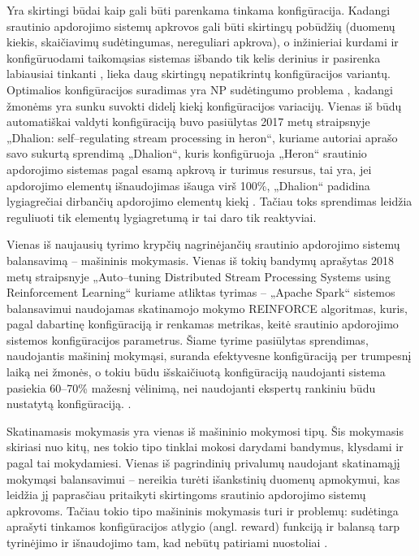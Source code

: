 \documentclass{VUMIFPSbakalaurinis}
\begin{document}
Yra skirtingi būdai kaip gali būti parenkama tinkama konfigūracija. Kadangi srautinio apdorojimo sistemų apkrovos gali būti skirtingų pobūdžių (duomenų kiekis, skaičiavimų sudėtingumas, nereguliari apkrova), o inžinieriai kurdami ir konfigūruodami taikomąsias sistemas išbando tik kelis derinius ir pasirenka labiausiai tinkanti \cite{selfRegulatingStreaming}, lieka daug skirtingų nepatikrintų konfigūracijos variantų. Optimalios konfigūracijos suradimas yra NP sudėtingumo problema \cite{automateTuning}, kadangi žmonėms yra sunku suvokti didelį kiekį konfigūracijos variacijų. 
Vienas iš būdų automatiškai valdyti konfigūraciją buvo pasiūlytas 2017 metų straipsnyje „Dhalion: self–regulating stream processing in heron“, kuriame autoriai aprašo savo sukurtą sprendimą „Dhalion“, kuris konfigūruoja „Heron“ srautinio apdorojimo sistemas pagal esamą apkrovą ir turimus resursus, tai yra, jei apdorojimo elementų išnaudojimas išauga virš 100\%, „Dhalion“ padidina lygiagrečiai dirbančių apdorojimo elementų kiekį \cite{dhalion}. Tačiau toks sprendimas leidžia reguliuoti tik elementų lygiagretumą ir tai daro tik reaktyviai.

Vienas iš naujausių tyrimo krypčių nagrinėjančių srautinio apdorojimo sistemų balansavimą – mašininis mokymasis. Vienas iš tokių bandymų aprašytas 2018 metų straipsnyje „Auto–tuning Distributed Stream Processing Systems using Reinforcement Learning“\cite{vaquero2018autotuning} kuriame atliktas tyrimas – „Apache Spark“ sistemos balansavimui naudojamas skatinamojo mokymo REINFORCE algoritmas, kuris, pagal dabartinę konfigūraciją ir renkamas metrikas, keitė srautinio apdorojimo sistemos konfigūracijos parametrus. Šiame tyrime pasiūlytas sprendimas, naudojantis mašininį mokymąsi, suranda efektyvesne konfigūraciją per trumpesnį laiką nei žmonės, o tokiu būdu išskaičiuotą konfigūraciją naudojanti sistema pasiekia 60–70\% mažesnį vėlinimą, nei naudojanti ekspertų rankiniu būdu nustatytą konfigūraciją. \cite{vaquero2018autotuning}. 

Skatinamasis mokymasis yra vienas iš mašininio mokymosi tipų. Šis mokymasis skiriasi nuo kitų, nes tokio tipo tinklai mokosi darydami bandymus, klysdami ir pagal tai mokydamiesi. Vienas iš pagrindinių privalumų naudojant skatinamąjį mokymąsi balansavimui – nereikia turėti išankstinių duomenų apmokymui, kas leidžia jį paprasčiau pritaikyti skirtingoms srautinio apdorojimo sistemų apkrovoms. Tačiau tokio tipo mašininis mokymasis turi ir problemų: sudėtinga aprašyti tinkamos konfigūracijos atlygio (angl. reward) funkciją ir balansą tarp tyrinėjimo ir išnaudojimo tam, kad nebūtų patiriami nuostoliai \cite{selfRegulatingStreaming}.
\end{document}
